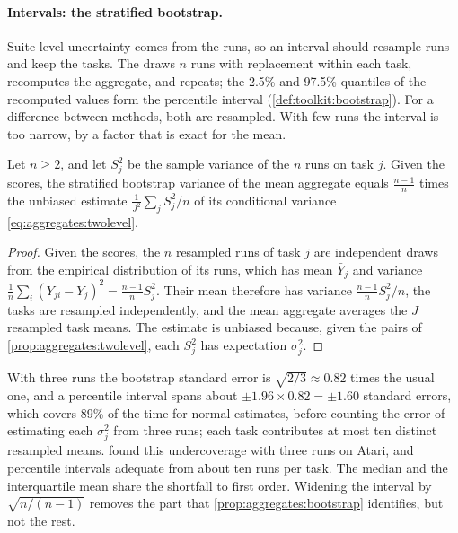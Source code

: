 \begin{refsection}
\paragraph{Intervals: the stratified bootstrap.} Suite-level uncertainty comes from the runs, so an interval should resample runs and keep the tasks. The  draws $n$ runs with replacement within each task, recomputes the aggregate, and repeats; the 2.5\% and 97.5\% quantiles of the recomputed values form the percentile interval (\cref{def:toolkit:bootstrap}). For a difference between methods, both are resampled. With few runs the interval is too narrow, by a factor that is exact for the mean.

\begin{proposition}\label{prop:aggregates:bootstrap}
Let $n\ge2$, and let $S_j^2$ be the sample variance of the $n$ runs on task $j$. Given the scores, the stratified bootstrap variance of the mean aggregate equals $\frac{n-1}n$ times the unbiased estimate $\frac1{J^2}\sum_jS_j^2/n$ of its conditional variance \eqref{eq:aggregates:twolevel}.
\end{proposition}

\begin{proof}
Given the scores, the $n$ resampled runs of task $j$ are independent draws from the empirical distribution of its runs, which has mean $\bar Y_j$ and variance $\frac1n\sum_i(Y_{ji}-\bar Y_j)^2=\frac{n-1}nS_j^2$. Their mean therefore has variance $\frac{n-1}nS_j^2/n$, the tasks are resampled independently, and the mean aggregate averages the $J$ resampled task means. The estimate is unbiased because, given the pairs of \cref{prop:aggregates:twolevel}, each $S_j^2$ has expectation $\sigma_j^2$.
\end{proof}

With three runs the bootstrap standard error is $\sqrt{2/3}\approx0.82$ times the usual one, and a percentile interval spans about $\pm1.96\times0.82=\pm1.60$ standard errors, which covers 89\% of the time for normal estimates, before counting the error of estimating each $\sigma_j^2$ from three runs; each task contributes at most ten distinct resampled means. \Textcite[Figure~6]{AgarwalEtAl2021} found this undercoverage with three runs on Atari, and percentile intervals adequate from about ten runs per task. The median and the interquartile mean share the shortfall to first order. Widening the interval by $\sqrt{n/(n-1)}$ removes the part that \cref{prop:aggregates:bootstrap} identifies, but not the rest.


\end{refsection}
